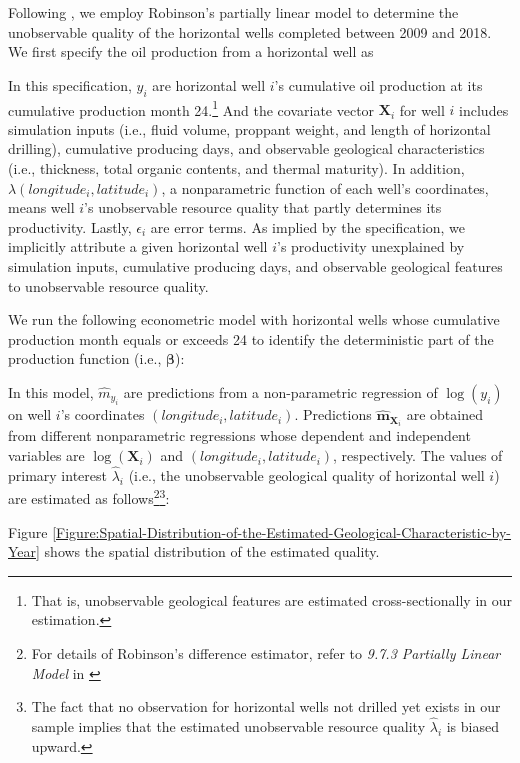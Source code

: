 Following \cite{The-Economics-of-Time-Limited-Development-Options_2020_Herrnstadt-Kellogg-and-Lewis}, we employ Robinson's partially linear model to determine the unobservable quality of the horizontal wells completed between 2009 and 2018. We first specify the oil production from a horizontal well as

In this specification, $y_{i}$ are horizontal well $i$'s cumulative oil production at its cumulative production month 24.\footnote{That is, unobservable geological features are estimated cross-sectionally in our estimation.} And the covariate vector $\boldsymbol{X}_{i}$ for well $i$ includes simulation inputs (i.e., fluid volume, proppant weight, and length of horizontal drilling), cumulative producing days, and observable geological characteristics (i.e., thickness, total organic contents, and thermal maturity). In addition, $\lambda(longitude_{i}, latitude_{i})$, a nonparametric function of each well's coordinates, means well $i$'s unobservable resource quality that partly determines its productivity. Lastly, $\epsilon_{i}$ are error terms. As implied by the specification, we implicitly attribute a given horizontal well $i$'s productivity unexplained by simulation inputs, cumulative producing days, and observable geological features to unobservable resource quality. 

We run the following econometric model with horizontal wells whose cumulative production month equals or exceeds 24 to identify the deterministic part of the production function (i.e., $\boldsymbol{\beta}$):

In this model, $\widehat{m}_{y_{i}}$ are predictions from a non-parametric regression of $\log \left( y_{i} \right)$ on well $i$'s coordinates $(longitude_{i}, latitude_{i})$. Predictions $\widehat{\boldsymbol{m}}_{\boldsymbol{X}_{i}}$ are obtained from different nonparametric regressions whose dependent and independent variables are $\log \left( \boldsymbol{X}_{i} \right)$ and $(longitude_{i}, latitude_{i})$, respectively. The values of primary interest $\widehat{\lambda}_{i}$ (i.e., the unobservable geological quality of horizontal well $i$) are estimated as follows\footnote{For details of Robinson's difference estimator, refer to \textit{9.7.3 Partially Linear Model} in \cite{MicroEconometrics-Methods-and-Applications_Cameron-and-Trivedi_2005}}\footnote{The fact that no observation for horizontal wells not drilled yet exists in our sample implies that the estimated unobservable resource quality $\widehat{\lambda}_{i}$ is biased upward.}:

Figure \ref{Figure:Spatial-Distribution-of-the-Estimated-Geological-Characteristic-by-Year} shows the spatial distribution of the estimated quality.
